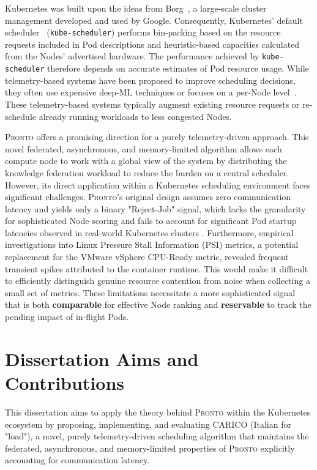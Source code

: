 Kubernetes was built upon the ideas from Borg~\cite{}, a large-scale cluster
management developed and used by Google. Consequently, Kubernetes' default
scheduler~\cite{kube-scheduler} (\texttt{kube-scheduler}) performs bin-packing
based on the resource requests included in Pod descriptions and heuristic-based
capacities calculated from the Nodes' advertised hardware. The performance
achieved by \texttt{kube-scheduler} therefore depends on accurate estimates of
Pod resource usage. While telemetry-based systems have been proposed to improve
scheduling decisions, they often use expensive deep-ML techniques
\cite{bao2019deep, peng2021dl2} or focuses on a per-Node
level~\cite{yang2019design}. These telemetry-based systems typically augment
existing resource requests or re-schedule already running workloads to less
congested Nodes.

\textsc{Pronto} \cite{grammenos_pronto_2021} offers a promising direction for a
purely telemetry-driven approach. This novel federated, asynchronous, and
memory-limited algorithm allows each compute node to work with a
global view of the system by distributing the knowledge federation workload to
reduce the burden on a central scheduler. However, its direct application within
a Kubernetes scheduling
environment faces significant challenges. \textsc{Pronto}'s original design
assumes zero communication latency and yields only a binary "Reject-Job" signal,
which lacks the granularity for sophisticated Node scoring and fails to account
for significant Pod startup latencies observed in real-world Kubernetes clusters
\cite{qadeer_scaling_2022}. Furthermore, empirical investigations into Linux
Pressure Stall Information (PSI) metrics, a potential replacement for the VMware
vSphere CPU-Ready metric, revealed frequent transient spikes attributed to the
container runtime. This would make it difficult to efficiently distinguish
genuine resource contention from noise when collecting a small set of metrics.
These limitations necessitate a more sophisticated signal that is both
\textbf{comparable} for effective Node ranking and \textbf{reservable} to track
the pending impact of in-flight Pods.

\section{Dissertation Aims and Contributions}

This dissertation aims to apply the theory behind \textsc{Pronto} within the
Kubernetes ecosystem by proposing, implementing, and evaluating \textsc{CARICO} (Italian
for "load"), a novel, purely telemetry-driven scheduling algorithm that
maintains the federated, asynchronous, and memory-limited properties of
\textsc{Pronto} explicitly accounting for communication latency.

